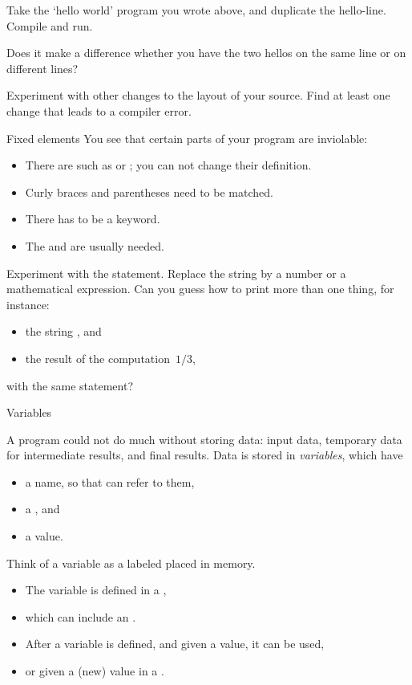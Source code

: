 \begin{exercise}
  \label{ex:hello-line}
  Take the `hello world' program you wrote above, and duplicate the
  hello-line. Compile and run.

  Does it make a difference whether you have the two hellos on the
  same line or on different lines?

  Experiment with other changes to the layout of your source. Find at
  least one change that leads to a compiler error.
\end{exercise}

\begin{block}{Fixed elements}
  \label{sl:fixedstuff}
  You see that certain parts of your program are inviolable:
  \begin{itemize}
  \item There are  such as  or ; you
    can not change their definition.
  \item Curly braces and parentheses need to be matched.
  \item There has to be a  keyword.
  \item The  and  are usually needed.
  \end{itemize}
\end{block}

\begin{exercise}
  \label{ex:cout-what}
  Experiment with the  statement. Replace the string by a
  number or a mathematical expression. Can you guess how to print more
  than one thing, for instance:
  \begin{itemize}
  \item the string , and
  \item the result of the computation~$1/3$,     
  \end{itemize}
  with the same  statement?
\end{exercise}

 {Variables}
\label{sec:variables}

A program could not do much without storing data: input data,
temporary data for intermediate results, and final results.
Data is stored in \emph{variables},  which have
\begin{itemize}
\item a name, so that can refer to them,
\item a , and
\item a value.
\end{itemize}
Think of a variable as a labeled placed in memory.
\begin{itemize}
\item The variable is defined in a
  ,
\item which can include an .
\item After a variable is defined, and given a value, it can be used,
\item or given a (new) value in a .
\end{itemize}

